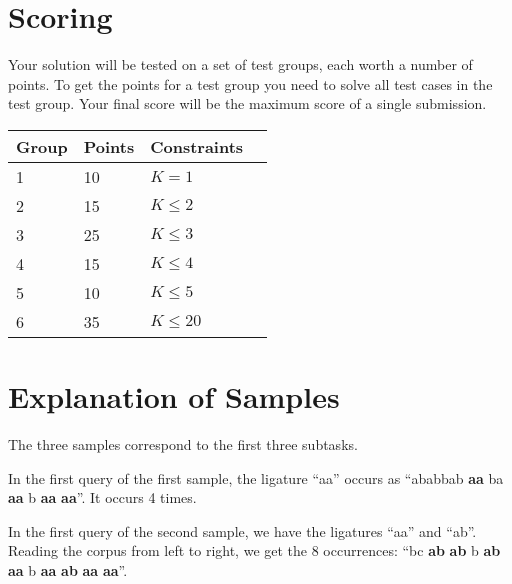 \section*{Scoring}
Your solution will be tested on a set of test groups, each worth a number of points.
To get the points for a test group you need to solve all test cases in the test group.
Your final score will be the maximum score of a single submission.

\noindent
\begin{tabular}{| l | l | l | l |}
\hline
Group & Points & Constraints \\ \hline
1     & 10     & $K = 1$ \\ \hline
2     & 15     & $K \le 2$ \\ \hline
3     & 25     & $K \le 3$ \\ \hline
4     & 15     & $K \le 4$ \\ \hline
5     & 10     & $K \le 5$ \\ \hline
6     & 35     & $K \le 20$ \\ \hline
\end{tabular}

\section*{Explanation of Samples}
The three samples correspond to the first three subtasks.

In the first query of the first sample, the ligature ``aa'' occurs as ``ababbab \textbf{aa} ba \textbf{aa} b \textbf{aa} \textbf{aa}''.
It occurs 4 times.

In the first query of the second sample, we have the ligatures ``aa'' and ``ab''.
Reading the corpus from left to right, we get the 8 occurrences:
``bc \textbf{ab} \textbf{ab} b \textbf{ab} \textbf{aa} b \textbf{aa} \textbf{ab} \textbf{aa} \textbf{aa}''.
